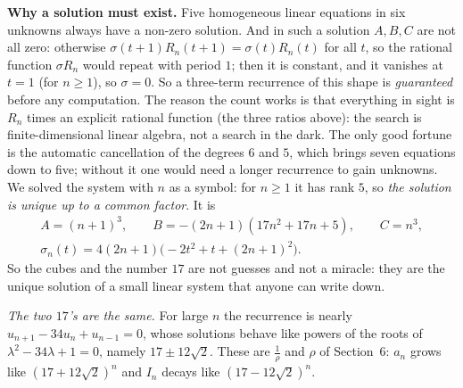 \documentclass[11pt]{article}
\theoremstyle{remark}
\newcommand{\q}[1]{\medskip\noindent\textbf{#1}}
\begin{document}
\q{Why a solution must exist.} Five homogeneous linear equations in six unknowns always have a
non-zero solution. And in such a solution $A,B,C$ are not all zero: otherwise
$\sigma(t+1)R_n(t+1)=\sigma(t)R_n(t)$ for all $t$, so the rational function $\sigma R_n$ would repeat with
period $1$; then it is constant, and it vanishes at $t=1$ (for $n\ge1$), so $\sigma=0$. So a three-term recurrence of this shape is \emph{guaranteed}
before any computation. The reason the count works is that everything in sight is $R_n$ times an
explicit rational function (the three ratios above): the search is finite-dimensional linear
algebra, not a search in the dark. The only good fortune is the automatic cancellation of the
degrees $6$ and $5$, which brings seven equations down to five; without it one would need a longer
recurrence to gain unknowns. We solved the
system with $n$ as a symbol: for $n\ge1$ it has rank $5$, so \emph{the solution is unique up to a
common factor}. It is
\begin{gather*}
A=(n+1)^3,\qquad B=-(2n+1)(17n^2+17n+5),\qquad C=n^3,\\
\sigma_n(t)=4(2n+1)\bigl(-2t^2+t+(2n+1)^2\bigr).
\end{gather*}
So the cubes and the number $17$ are not guesses and not a miracle: they are the unique solution of
a small linear system that anyone can write down.

\emph{The two $17$'s are the same.} For large $n$ the recurrence is nearly
$u_{n+1}-34u_n+u_{n-1}=0$, whose solutions behave like powers of the roots of
$\lambda^2-34\lambda+1=0$, namely $17\pm12\sqrt2$. These are $\frac1\rho$ and $\rho$ of Section~6:
$a_n$ grows like $(17+12\sqrt2)^n$ and $I_n$ decays like $(17-12\sqrt2)^n$.
\end{document}
